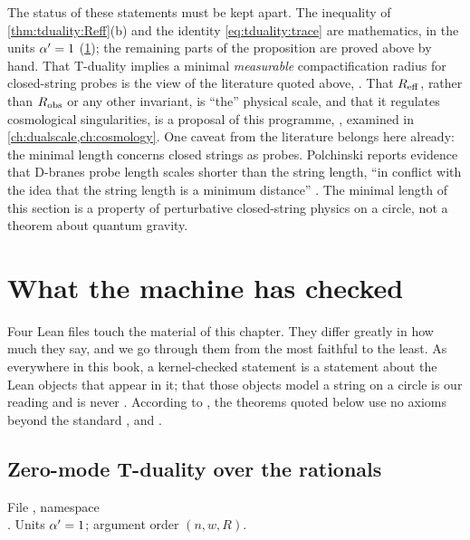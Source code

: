 The status of these statements must be kept apart. The inequality of
\cref{thm:tduality:Reff}(b) and the identity \eqref{eq:tduality:trace} are mathematics, \TA{} in
the units $\alpha'=1$ (\cref{sec:tduality:lean}); the remaining parts of the proposition are proved
above by hand. That T-duality implies a minimal \emph{measurable} compactification
radius for closed-string probes is the view of the literature quoted above, \TL. That
$R_{\rm eff}$, rather than $R_{\rm obs}$ or any other invariant, is ``the'' physical scale, and
that it regulates cosmological singularities, is a proposal of this programme, \TC, examined
in \cref{ch:dualscale,ch:cosmology}. One caveat from the literature belongs here already:
the minimal length concerns closed strings as probes. Polchinski reports evidence that D-branes
probe length scales shorter than the string length, ``in conflict with the idea that the
string length is a minimum distance'' . The minimal length of this
section is a property of perturbative closed-string physics on a circle, not a theorem about
quantum gravity.

\section{What the machine has checked}\label{sec:tduality:lean}

Four Lean files touch the material of this chapter. They differ greatly in how much they
say, and we go through them from the most faithful to the least. As everywhere in this book,
a kernel-checked statement is a statement about the Lean objects that appear in it; that those
objects model a string on a circle is our reading and is never \TA. According to
, the theorems quoted below use no axioms beyond the standard
,  and .

\subsection{Zero-mode T-duality over the rationals}

File , namespace\\
. Units $\alpha'=1$; argument order $(n,w,R)$.

